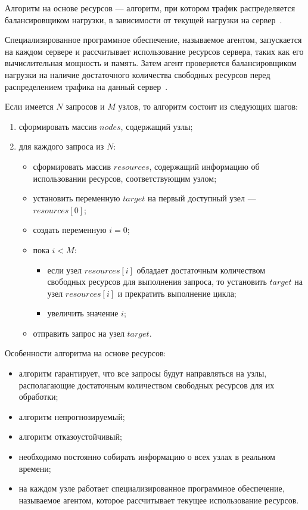 Алгоритм на основе ресурсов --- алгоритм, при котором трафик распределяется балансировщиком нагрузки, в зависимости от текущей нагрузки на сервер~\cite{aws}.

Специализированное программное обеспечение, называемое агентом, запускается на каждом сервере и рассчитывает использование ресурсов сервера, таких как его вычислительная мощность и память. 
Затем агент проверяется балансировщиком нагрузки на наличие достаточного количества свободных ресурсов перед распределением трафика на данный сервер~\cite{aws}.

Если имеется $N$ запросов и $M$ узлов, то алгоритм состоит из следующих шагов:
\begin{enumerate}
	\item сформировать массив $nodes$, содержащий узлы;
	\item для каждого запроса из $N$:
	\begin{itemize}
		\item сформировать массив $resources$, содержащий информацию об использовании ресурсов, соответствующим узлом;
		\item установить переменную $target$ на первый доступный узел --- $resources[0]$;
		\item создать переменную $i = 0$;
		\item пока $i < M$:
		\begin{itemize}
			\item если узел $resources[i]$ обладает достаточным количеством свободных ресурсов для выполнения запроса, то установить $target$ на узел $resources[i]$ и  прекратить выполнение цикла;
			\item увеличить значение $i$;
		\end{itemize}
		\item отправить запрос на узел $target$.
	\end{itemize}
\end{enumerate}

Особенности алгоритма на основе ресурсов:
\begin{itemize}
	\item алгоритм гарантирует, что все запросы будут направляться на узлы, располагающие достаточным количеством свободных ресурсов для их обработки;
    \item алгоритм непрогнозируемый;
    \item алгоритм отказоустойчивый;
    \item необходимо постоянно собирать информацию о всех узлах в реальном времени;
    \item на каждом узле работает специализированное программное обеспечение, называемое агентом, которое рассчитывает текущее использование ресурсов.
\end{itemize}
